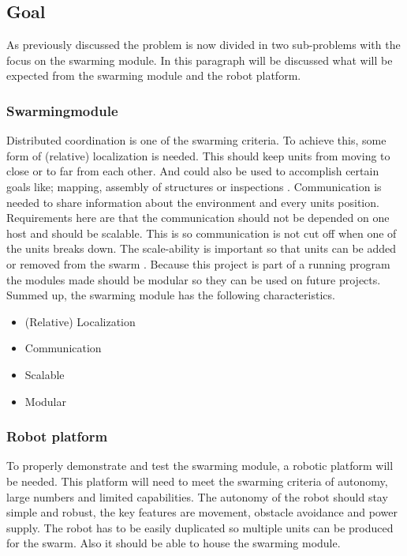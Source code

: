 \documentclass[10pt,a4paper]{article}
\begin{document}
\subsection{Goal}
As previously discussed the problem is now divided in two sub-problems with the focus on the swarming module. In this paragraph will be discussed what will be expected from the swarming module and the robot platform.

\subsubsection{Swarmingmodule}
Distributed coordination is one of the swarming criteria. To achieve this, some form of (relative) localization is needed. This should keep units from moving to close or to far from each other. And could also be used to accomplish certain goals like;  mapping, assembly of structures or inspections \cite{networkedRS}. Communication is needed to share information about the environment and every units position. Requirements here are that the communication should not be depended on one host and should be scalable. This is so communication is not cut off when one of the units breaks down. The scale-ability is important so that units can be added or removed from the swarm \cite{multidomaincom}. Because this project is part of a running program the modules made should be modular so they can be used on future projects. Summed up, the swarming module has the following characteristics.

\begin{itemize}
\item (Relative) Localization
\item Communication
\item Scalable
\item Modular
\end{itemize}

\subsubsection{Robot platform}
To properly demonstrate and test the swarming module, a robotic platform will be needed. This platform will need to meet the swarming criteria of autonomy, large numbers and limited capabilities. The autonomy of the robot should stay simple and robust, the key features are movement, obstacle avoidance and power supply. The robot has to be easily duplicated so multiple units can be produced for the swarm. Also it should be able to house the swarming module.
\end{document}
